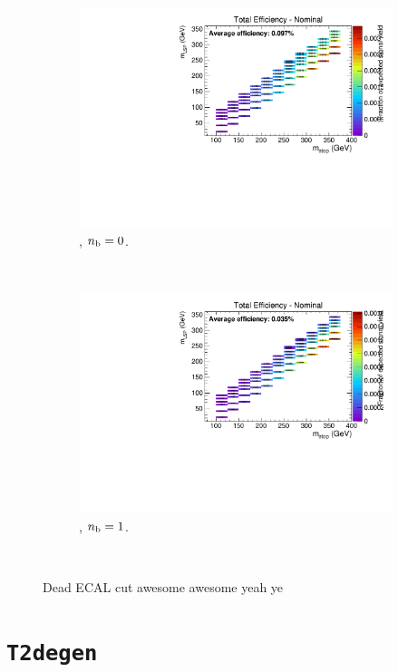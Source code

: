 \begin{figure}[h!]
\begin{subfigure}[b]{0.4\textwidth}
    \includegraphics[width=\textwidth, page=3]{Figs/sms/t2cc/v24/DeadECAL_T2cc_v24_eq0b_ge4j_incl.pdf}
    \caption{\njhigh, $n_{\text{b}} = 0$.}
  \end{subfigure}\\
  \begin{subfigure}[b]{0.4\textwidth}
    \includegraphics[width=\textwidth, page=3]{Figs/sms/t2cc/v24/DeadECAL_T2cc_v24_eq1b_ge4j_incl.pdf}
    \caption{\njhigh, $n_{\text{b}} = 1$.}
  \end{subfigure}\\
  \caption{Dead ECAL cut awesome awesome yeah ye}
  \label{fig:sms-deadecal-t2cc}
\end{figure}



\section*{\texttt{T2degen}}
\label{sec:t2degen_syst_plots}

